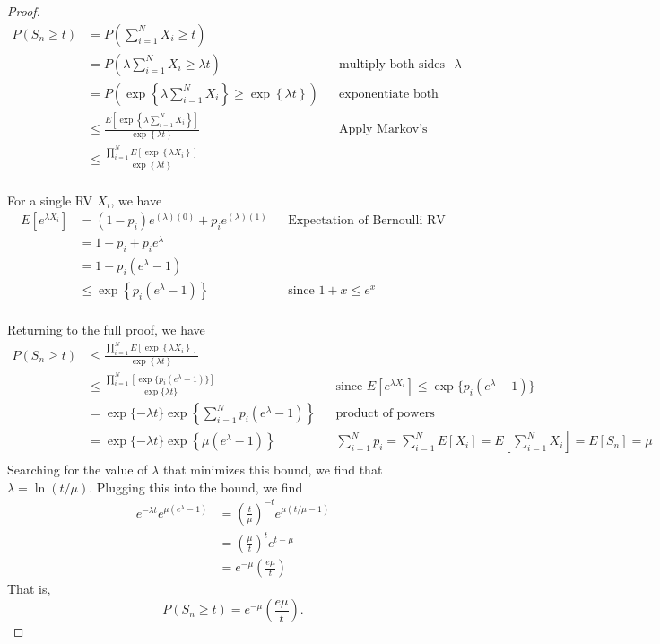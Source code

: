\begin{proof}
\begin{align*}
    P(S_n \geq t) &= P\left(\sum_{i=1}^{N}X_i \geq t\right) \\
    &= P\left(\lambda\sum_{i=1}^{N}X_i \geq \lambda t\right) &&\text{multiply both sides by $\lambda$} \\
    &= P\left( \exp\left\{\lambda\sum_{i=1}^{N}X_i\right\} \geq 
        \exp\left\{\lambda t \right\} \right) && \text{exponentiate both sides} \\
    &\leq \frac{E\left[\exp\left\{\lambda \sum_{i=1}^{N}X_i \right\}\right]}{\exp\left\{ \lambda t \right\}} &&\text{Apply Markov's inequality} \\ 
    &\leq \frac{\prod_{i=1}^{N} E\left[\exp\left\{\lambda X_i \right\}\right]}{\exp\left\{ \lambda t \right\}} &&\text{} \\ 
\end{align*}

For a single RV $X_i$, we have 
\begin{align*}
E\left[e^{\lambda X_i}\right] &= (1-p_i) e^{(\lambda)(0)} + p_i e^{ (\lambda)(1) } &&\text{Expectation of Bernoulli RV} \\ 
&= 1 - p_i + p_i e^{\lambda} &&\text{} \\
&= 1 + p_i(e^\lambda - 1) \\
&\leq \exp\left\{ p_i(e^\lambda - 1) \right\} &&\text{since $1+x \leq e^x$} \\
\end{align*}

Returning to the full proof, we have 
\begin{align*}
    P(S_n \geq t) &\leq \frac{\prod_{i=1}^{N} E\left[\exp\left\{\lambda X_i \right\}\right]}{\exp\left\{ \lambda t \right\}} &&\text{} \\ 
    &\leq \frac{ \prod_{i=1}^{N} \left[ \exp\{p_i(e^\lambda - 1)\} \right] }{\exp\{\lambda t\}} &&\text{since $E[e^{\lambda X_i}] \leq \exp\{p_i(e^\lambda - 1)\}$}\\
    &= \exp\{-\lambda t\}\exp\left\{ \sum_{i=1}^{N}p_i(e^\lambda - 1) \right\} &&\text{product of powers} \\
    &= \exp\{-\lambda t\}\exp\left\{ \mu (e^\lambda - 1) \right\} &&\text{$\sum_{i=1}^{N}p_i = \sum_{i=1}^{N}E[X_i] = E\left[\sum_{i=1}^{N}X_i\right] = E\left[S_n\right] = \mu$} \\
\end{align*}
Searching for the value of $\lambda$ that minimizes this bound, we find that $\lambda = \ln(t/\mu)$. Plugging this into the bound, we find  
\begin{align*}
    e^{-\lambda t} e^{\mu(e^\lambda - 1)} &= \left(\frac{t}{\mu}\right)^{-t} e^{ \mu \left(t/\mu-1\right) } \\
    &= \left(\frac{\mu}{t}\right)^{t} e^{ t-\mu } \\
    &= e^{-\mu} \left( \frac{e \mu}{t} \right)
\end{align*}
That is, 
$$ P(S_n \geq t) = e^{-\mu} \left( \frac{e \mu}{t} \right). $$
\end{proof}




